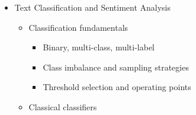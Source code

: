 \documentclass[
]{article}
\providecommand{\tightlist}{%
  \setlength{\itemsep}{0pt}\setlength{\parskip}{0pt}}
\begin{document}
\begin{itemize}
\begin{itemize}
    \begin{itemize}
    \tightlist
    \item
      \texttt{T5} and text-to-text framing
    \item
      \texttt{BART} and \texttt{mBART}
    \item
      Multilingual variants
    \end{itemize}
  \item
    Tokenizers and pre-training data

    \begin{itemize}
    \tightlist
    \item
      \texttt{WordPiece}, BPE, \texttt{SentencePiece}
    \item
      Pre-training corpora and filtering
    \item
      Data quality and downstream effects
    \end{itemize}
  \item
    Fine-tuning

    \begin{itemize}
    \tightlist
    \item
      Adding task-specific heads
    \item
      Learning rate schedules and warmup
    \item
      Catastrophic forgetting
    \item
      Parameter-efficient fine-tuning (\texttt{LoRA}, prefix tuning,
      adapters)
    \end{itemize}
  \item
    Few-shot and zero-shot learning

    \begin{itemize}
    \tightlist
    \item
      In-context learning
    \item
      Prompt design as a fine-tuning alternative
    \item
      Limits of zero-shot generalization
    \end{itemize}
  \end{itemize}
\item
  Text Classification and Sentiment Analysis

  \begin{itemize}
  \tightlist
  \item
    Classification fundamentals

    \begin{itemize}
    \tightlist
    \item
      Binary, multi-class, multi-label
    \item
      Class imbalance and sampling strategies
    \item
      Threshold selection and operating points
    \end{itemize}
  \item
    Classical classifiers


\end{itemize}
\end{itemize}
\end{document}
